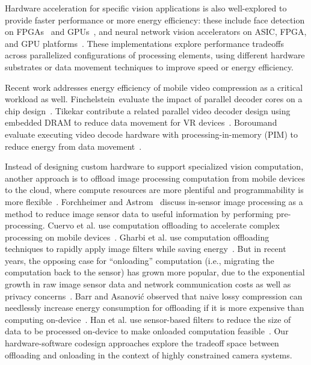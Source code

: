 Hardware acceleration for specific vision applications is also well-explored to provide faster performance or more energy efficiency: these include face detection on FPGAs~\cite{cvpr2007, cho_parallelized_2009} and GPUs~\cite{vj_gpu}, and neural network vision accelerators on ASIC, FPGA, and GPU platforms~\cite{farabet2010, neuflow,snnap,nn_fpga,nsp_iscas,bilat_isscc,myriad15,convolution_engine,shidiannao,minerva,eyeriss,buckler2018eva2}.
These implementations explore performance tradeoffs across parallelized configurations of processing elements, using different hardware substrates or data movement techniques to improve speed or energy efficiency.

Recent work addresses energy efficiency of mobile video compression as a critical workload as well.
Finchelstein~\etal evaluate the impact of parallel decoder cores on a \avc chip design~\cite{multicore-avc}.
Tikekar \etal contribute a related parallel video decoder design using embedded DRAM to reduce data movement for VR devices~\cite{tikekar18ijssc}.
Boroumand \etal evaluate executing video decode hardware with processing-in-memory (PIM) to reduce energy from data movement~\cite{google2018asplos}.

Instead of designing custom hardware to support specialized vision computation, another approach is to offload image processing computation from mobile devices to the cloud, where compute resources are more plentiful and programmability is more flexible~\cite{pervasive_compute}.
Forchheimer and Astrom~\cite{Forchheimer94} discuss in-sensor image processing as a method to reduce image sensor data to useful information by performing pre-processing.
Cuervo et al. use computation offloading to accelerate complex processing on mobile devices~\cite{cuervo2010maui}.
Gharbi et al. use computation offloading techniques to rapidly apply image filters while saving energy~\cite{transform_recipes}.
But in recent years, the opposing case for ``onloading'' computation (i.e., migrating the computation back to the sensor) has grown more popular, due to the exponential growth in raw image sensor data and network communication costs as well as privacy concerns~\cite{han-hotos, likamwa-apsys}.
Barr and Asanovi\'{c} observed that naive lossy compression can needlessly increase energy consumption for offloading if it is more expensive than computing on-device~\cite{barr_asanovic}.
Han et al. use sensor-based filters to reduce the size of data to be processed on-device to make onloaded computation feasible~\cite{glimpsedata}.
Our hardware-software codesign approaches explore the tradeoff space between offloading and onloading in the context of highly constrained camera systems.

